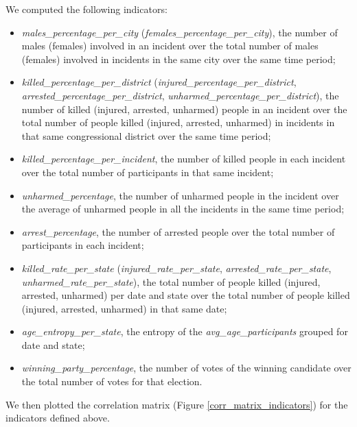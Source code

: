 \documentclass[11pt,a4paper]{report}
\begin{document}
We computed the following indicators:
\begin{itemize}
	\item \textit{males\_percentage\_per\_city} (\textit{females\_percentage\_per\_city}), the number of males (females) involved in an incident over the total number of males (females) involved in incidents in the same city over the same time period;
	\item \textit{killed\_percentage\_per\_district} (\textit{injured\_percentage\_per\_district}, \textit{arrested\_percentage\_per\_district}, \textit{unhar\-med\_percentage\_per\_district}), the number of killed (injured, arrested, unharmed) people in an incident over the total number of people killed (injured, arrested, unharmed) in incidents in that same congressional district over the same time period;
	\item \textit{killed\_percentage\_per\_incident}, the number of killed people in each incident over the total number of participants in that same incident;
	\item \textit{unharmed\_percentage}, the number of unharmed people in the incident over the average of unharmed people in all the incidents in the same time period;
	\item \textit{arrest\_percentage}, the number of arrested people over the total number of participants in each incident;
	\item \textit{killed\_rate\_per\_state} (\textit{injured\_rate\_per\_state}, \textit{arrested\_rate\_per\_state}, \textit{unharmed\_rate\_per\_state}), the total number of people killed (injured, arrested, unharmed) per date and state over the total number of people killed (injured, arrested, unharmed) in that same date;
	\item \textit{age\_entropy\_per\_state}, the entropy of the \textit{avg\_age\_participants} grouped for date and state;
	\item \textit{winning\_party\_percentage}, the number of votes of the winning candidate over the total number of votes for that election.
\end{itemize}

We then plotted the correlation matrix (Figure \ref{corr_matrix_indicators}) for the indicators defined above.
\end{document}
